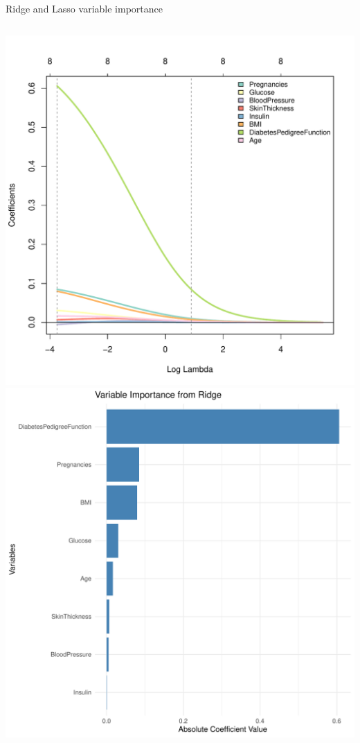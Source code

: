 \begin{frame}{Ridge and Lasso variable importance}
\begin{columns}[T]
\begin{column}{0.5\textwidth}
\includegraphics[width=0.85\columnwidth]{./Figures/logist/diabetes_ridge.pdf}
\includegraphics[width=0.7\columnwidth]{./Figures/logist/variable_importance_ridge.pdf}
\end{column}
\end{columns}

\end{frame}

